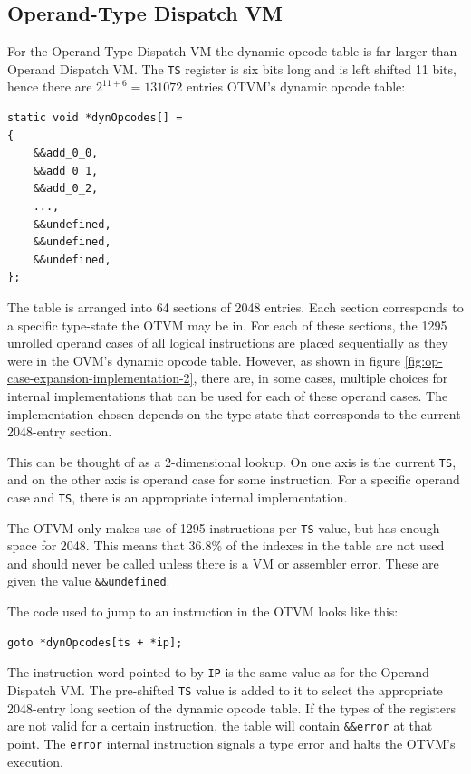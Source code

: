\documentclass[english,a4paper,12pt]{report}
\begin{document}
\subsection{Operand-Type Dispatch VM}
\label{sec:operand-type-dispatch-dispatch}
For the Operand-Type Dispatch VM the dynamic opcode table is far
larger than Operand Dispatch VM. The \verb|TS| register is six bits
long and is left shifted 11 bits, hence there are
$2^{11 + 6} = 131 072$ entries OTVM's dynamic opcode table:
\begin{lstlisting}
static void *dynOpcodes[] = 
{
    &&add_0_0,
    &&add_0_1,
    &&add_0_2,
    ...,
    &&undefined,
    &&undefined,
    &&undefined,	
};	
\end{lstlisting}

The table is arranged into 64 sections of 2048 entries. Each section
corresponds to a specific type-state the OTVM may be in. For each of
these sections, the 1295 unrolled operand cases of all logical
instructions are placed sequentially as they were in the OVM's dynamic
opcode table. However, as shown in figure
\ref{fig:op-case-expansion-implementation-2}, there are, in some
cases, multiple choices for internal implementations that can be used
for each of these operand cases. The implementation chosen depends on
the type state that corresponds to the current 2048-entry section.

This can be thought of as a 2-dimensional lookup. On one axis is the
current \verb|TS|, and on the other axis is operand case for some
instruction. For a specific operand case and \verb|TS|, there is an
appropriate internal implementation.

The OTVM only makes use of 1295 instructions per \verb|TS| value, but
has enough space for 2048. This means that 36.8\% of the indexes in
the table are not used and should never be called unless there is a VM
or assembler error. These are given the value \verb|&&undefined|.

The code used to jump to an instruction in the OTVM looks like this:
\begin{lstlisting}
goto *dynOpcodes[ts + *ip];
\end{lstlisting}

The instruction word pointed to by \verb|IP| is the same value as for
the Operand Dispatch VM. The pre-shifted \verb|TS| value is added to
it to select the appropriate 2048-entry long section of the dynamic
opcode table. If the types of the registers are not valid for a
certain instruction, the table will contain \verb|&&error| at that
point. The \verb|error| internal instruction signals a type error and
halts the OTVM's execution.
\end{document}
